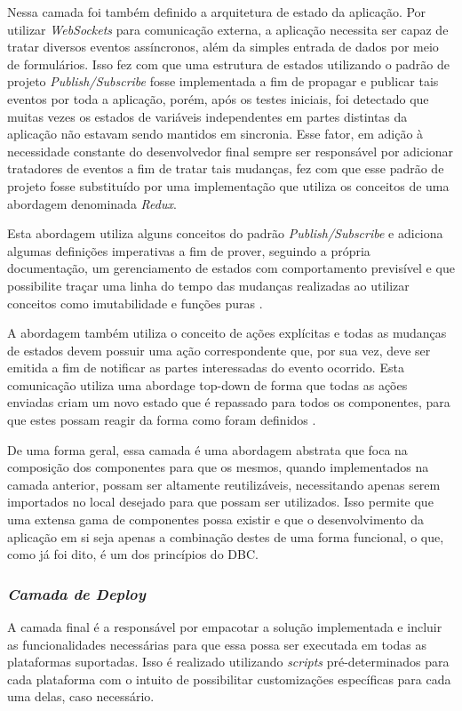 Nessa camada foi também definido a arquitetura de estado da aplicação. Por utilizar \textit{WebSockets} para comunicação externa, a aplicação necessita ser capaz de tratar diversos eventos assíncronos, além da simples entrada de dados por meio de formulários. Isso fez com que uma estrutura de estados utilizando o padrão de projeto\textit{ Publish/Subscribe} fosse implementada a fim de propagar e publicar tais eventos por toda a aplicação, porém, após os testes iniciais, foi detectado que muitas vezes os estados de variáveis independentes em partes distintas da aplicação não estavam sendo mantidos em sincronia. Esse fator, em adição à necessidade constante do desenvolvedor final sempre ser responsável por adicionar tratadores de eventos a fim de tratar tais mudanças, fez com que esse padrão de projeto fosse substituído por uma implementação que utiliza os conceitos de uma abordagem denominada \textit{Redux}.

Esta abordagem utiliza alguns conceitos do padrão \textit{Publish/Subscribe} e adiciona algumas definições imperativas a fim de prover, seguindo a própria documentação, um gerenciamento de estados com comportamento previsível e que possibilite traçar uma linha do tempo das mudanças realizadas ao utilizar conceitos como imutabilidade e funções puras \cite{redux}.

A abordagem também utiliza o conceito de ações explícitas e todas as mudanças de estados devem possuir uma ação correspondente que, por sua vez, deve ser emitida a fim de notificar as partes interessadas do evento ocorrido. Esta comunicação utiliza uma abordage top-down de forma que todas as ações enviadas criam um novo estado que é repassado para todos os componentes, para que estes possam reagir da forma como foram definidos \cite{redux}.

De uma forma geral, essa camada é uma abordagem abstrata que foca na composição dos componentes para que os mesmos, quando implementados na camada anterior, possam ser altamente reutilizáveis, necessitando apenas serem importados no local desejado para que possam ser utilizados. Isso permite que uma extensa gama de componentes possa existir e que o desenvolvimento da aplicação em si seja apenas a combinação destes de uma forma funcional, o que, como já foi dito, é um dos princípios do DBC.

\subsubsection{{\it Camada de Deploy}}
A camada final é a responsável por empacotar a solução implementada e incluir as funcionalidades necessárias para que essa possa ser executada em todas as plataformas suportadas. Isso é realizado utilizando \textit{scripts} pré-determinados para cada plataforma com o intuito de possibilitar customizações específicas para cada uma delas, caso necessário. 

